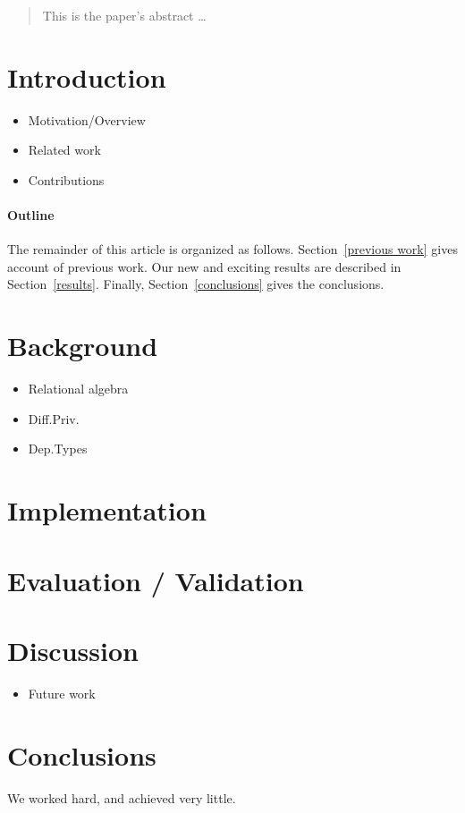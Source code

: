 \documentclass[12pt]{article}
\begin{document}
\maketitle

\begin{abstract}
This is the paper's abstract \ldots
\end{abstract}

\section{Introduction}\label{sec:introduction}
\begin{itemize}
  \item Motivation/Overview
  \item Related work
  \item Contributions
\end{itemize}

\paragraph{Outline}
The remainder of this article is organized as follows.
Section~\ref{previous work} gives account of previous work.
Our new and exciting results are described in Section~\ref{results}.
Finally, Section~\ref{conclusions} gives the conclusions.

\section{Background}\label{sec:background}

\begin{itemize}
  \item Relational algebra
  \item Diff.Priv.
  \item Dep.Types
\end{itemize}

\section{Implementation}\label{sec:implementation}

\section{Evaluation / Validation}\label{sec:evaluation}

\section{Discussion}\label{sec:discussion}

\begin{itemize}
  \item Future work
\end{itemize}

\section{Conclusions}\label{sec:conclusions}
We worked hard, and achieved very little.



\end{document}
